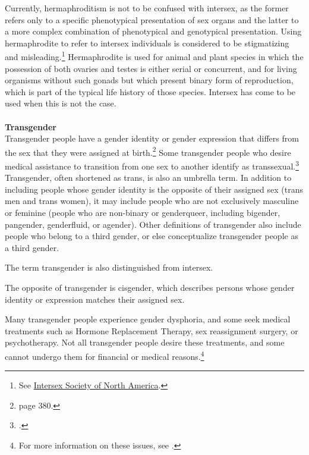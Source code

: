 Currently, hermaphroditism is not to be confused with intersex, as the former refers only to a specific phenotypical presentation of sex organs and the latter to a more complex combination of phenotypical and genotypical presentation. Using hermaphrodite to refer to intersex individuals is considered to be stigmatizing and misleading.\footnote{See \href{https://web.archive.org/web/20130701061246/http://www.isna.org/faq/hermaphrodite}{Intersex Society of North America}.} Hermaphrodite is used for animal and plant species in which the possession of both ovaries and testes is either serial or concurrent, and for living organisms without such gonads but which present binary form of reproduction, which is part of the typical life history of those species. Intersex has come to be used when this is not the case.\\
\\
\medskip
\large \textbf{Transgender}
\medskip
\\
Transgender people have a gender identity or gender expression that differs from the sex that they were assigned at birth.\footnote{\cite{altilio} page 380.} Some transgender people who desire medical assistance to transition from one sex to another identify as transsexual.\footnote{\cite{polly}.} Transgender, often shortened as trans, is also an umbrella term. In addition to including people whose gender identity is the opposite of their assigned sex (trans men and trans women), it may include people who are not exclusively masculine or feminine (people who are non-binary or genderqueer, including bigender, pangender, genderfluid, or agender). Other definitions of transgender also include people who belong to a third gender, or else conceptualize transgender people as a third gender.

The term transgender is also distinguished from intersex. 

The opposite of transgender is cisgender, which describes persons whose gender identity or expression matches their assigned sex.

Many transgender people experience gender dysphoria, and some seek medical treatments such as Hormone Replacement Therapy, sex reassignment surgery, or psychotherapy. Not all transgender people desire these treatments, and some cannot undergo them for financial or medical reasons.\footnote{For more information on these issues, see \cite{maizes}.}
